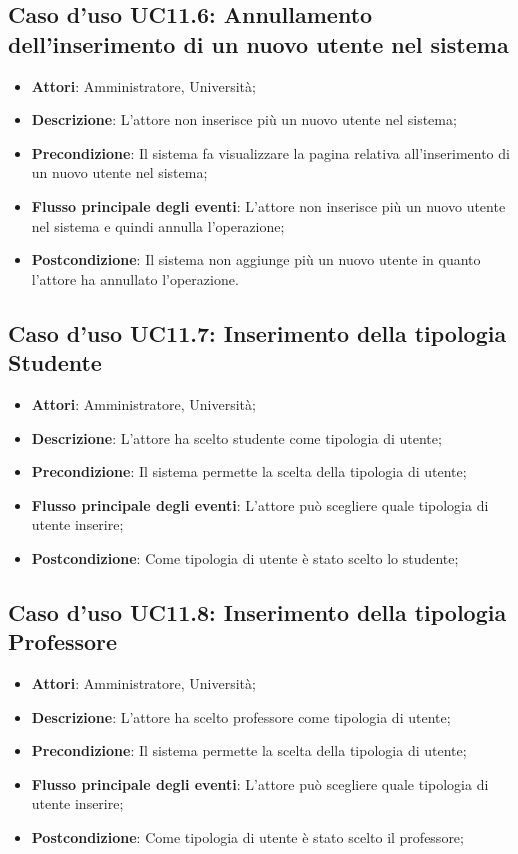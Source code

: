 \subsection{Caso d'uso \texorpdfstring{UC11.6}{UC11.6}: Annullamento dell'inserimento di un nuovo utente nel sistema}
\begin{itemize}
	\item \textbf{Attori}: Amministratore, Università;
	\item \textbf{Descrizione}: L'attore non inserisce più un nuovo utente nel sistema;
	\item \textbf{Precondizione}: Il sistema fa visualizzare la pagina relativa all'inserimento di un nuovo utente nel sistema;
	
	\item \textbf{Flusso principale degli eventi}: L'attore non inserisce più un nuovo utente nel sistema e quindi annulla l'operazione;
	\item \textbf{Postcondizione}: Il sistema non aggiunge più un nuovo utente in quanto l'attore ha annullato l'operazione.
	
\end{itemize}
\subsection{Caso d'uso \texorpdfstring{UC11.7}{UC11.7}: Inserimento della tipologia Studente}
\begin{itemize}
	\item \textbf{Attori}: Amministratore, Università;
	\item \textbf{Descrizione}: L'attore ha scelto studente come tipologia di utente; 
	\item \textbf{Precondizione}: Il sistema permette la scelta della tipologia di utente;
	\item \textbf{Flusso principale degli eventi}: L'attore può scegliere quale tipologia di utente inserire;
	\item \textbf{Postcondizione}: Come tipologia di utente è stato scelto lo studente;
\end{itemize}
\subsection{Caso d'uso \texorpdfstring{UC11.8}{UC11.8}: Inserimento della tipologia Professore}
\begin{itemize}
	\item \textbf{Attori}: Amministratore, Università;
	\item \textbf{Descrizione}: L'attore ha scelto professore come tipologia di utente; 
	\item \textbf{Precondizione}: Il sistema permette la scelta della tipologia di utente;
	\item \textbf{Flusso principale degli eventi}: L'attore può scegliere quale tipologia di utente inserire;
	\item \textbf{Postcondizione}: Come tipologia di utente è stato scelto il professore;
\end{itemize}
